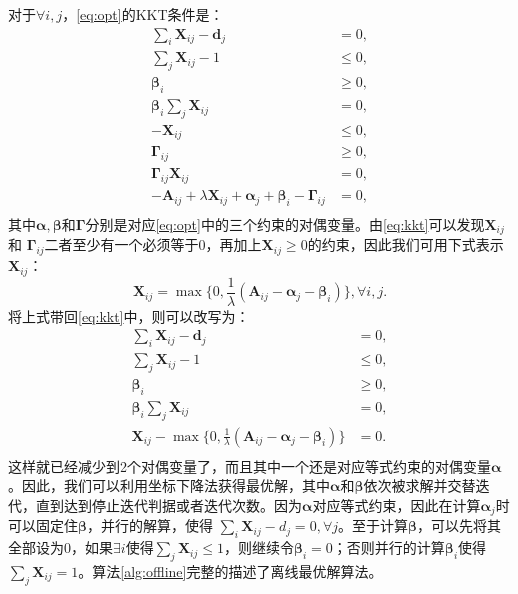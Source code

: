 对于$\forall i,j$，\eqref{eq:opt}的KKT条件是：
\begin{equation}
\begin{aligned}
\sum_i{\bm{X}_{ij}} - \bm{d}_j &= 0, \\
\sum_j{\bm{X}_{ij}} -1 &\le 0, \\
\bm{\beta}_i &\ge 0, \\
\bm{\beta}_i\sum_j \bm{X}_{ij} &= 0, \\
-\bm{X}_{ij} &\le 0, \\
\bm{\Gamma}_{ij} &\ge 0, \\
\bm{\Gamma}_{ij}\bm{X}_{ij} &= 0, \\
-\bm{A}_{ij} + \lambda\bm{X}_{ij} + \bm{\alpha}_j + \bm{\beta}_i - \bm{\Gamma}_{ij} &= 0, \\ 
\label{eq:kkt}
\end{aligned}
\end{equation}
其中$\bm{\alpha}, \bm{\beta}$和$\bm{\Gamma}$分别是对应\eqref{eq:opt}中的三个约束的对偶变量。由\eqref{eq:kkt}可以发现$\bm{X}_{ij}$ 和 $\bm{\Gamma}_{ij}$二者至少有一个必须等于0，再加上$\bm{X}_{ij} \ge 0$的约束，因此我们可用下式表示$\bm{X}_{ij}$：
\begin{equation}
\bm{X}_{ij} = \max\{0, \frac{1}{\lambda} (\bm{A}_{ij} - \bm{\alpha}_j - \bm{\beta}_i)\}, \forall i, j. 
\label{eq:xeq}
\end{equation}
将上式带回\eqref{eq:kkt}中，则可以改写为：
\begin{equation}
\begin{aligned}
\sum_i{\bm{X}_{ij}} - \bm{d}_j &= 0, \\
\sum_j{\bm{X}_{ij}} - 1 &\le 0, \\
\bm{\beta}_i &\ge 0, \\
\bm{\beta}_i\sum_j \bm{X}_{ij} &= 0, \\
\bm{X}_{ij} - \max\{0, \frac{1}{\lambda} (\bm{A}_{ij} - \bm{\alpha}_j - \bm{\beta}_i)\} &= 0. \\ 
\end{aligned}
\end{equation}
这样就已经减少到2个对偶变量了，而且其中一个还是对应等式约束的对偶变量$\bm{\alpha}$。因此，我们可以利用坐标下降法获得最优解，其中$\bm{\alpha}$和$\bm{\beta}$依次被求解并交替迭代，直到达到停止迭代判据或者迭代次数。因为$\bm{\alpha}$对应等式约束，因此在计算$\bm{\alpha}_j$时可以固定住$\bm{\beta}$，并行的解算，使得 $\sum_i{\bm{X}_{ij}} - d_j = 0, \forall j$。至于计算$\bm{\beta}$，可以先将其全部设为0，如果$\exists i$使得$\sum_j{\bm{X}_{ij}} \le 1$，则继续令$\bm{\beta}_i=0$；否则并行的计算$\bm{\beta}_i$使得$\sum_j{\bm{X}_{ij}} = 1$。算法\ref{alg:offline}完整的描述了离线最优解算法。

